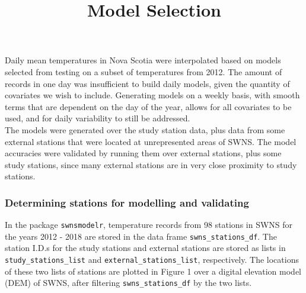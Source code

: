\documentclass[]{article}
\title{Model Selection}
\author{}
\date{}
\begin{document}
\maketitle

Daily mean temperatures in Nova Scotia were interpolated based on models
selected from testing on a subset of temperatures from 2012. The amount
of records in one day was insufficient to build daily models, given the
quantity of covariates we wish to include. Generating models on a weekly
basis, with smooth terms that are dependent on the day of the year,
allows for all covariates to be used, and for daily variability to still
be addressed.\\
The models were generated over the study station data, plus data from
some external stations that were located at unrepresented areas of SWNS.
The model accuracies were validated by running them over external
stations, plus some study stations, since many external stations are in
very close proximity to study stations.

\subsubsection{Determining stations for modelling and
validating}\label{determining-stations-for-modelling-and-validating}

In the package \texttt{swnsmodelr}, temperature records from 98 stations
in SWNS for the years 2012 - 2018 are stored in the data frame
\texttt{swns\_stations\_df}. The station I.D.s for the study stations
and external stations are stored as lists in
\texttt{study\_stations\_list} and \texttt{external\_stations\_list},
respectively. The locations of these two lists of stations are plotted
in Figure 1 over a digital elevation model (DEM) of SWNS, after
filtering \texttt{swns\_stations\_df} by the two lists.
\end{document}
